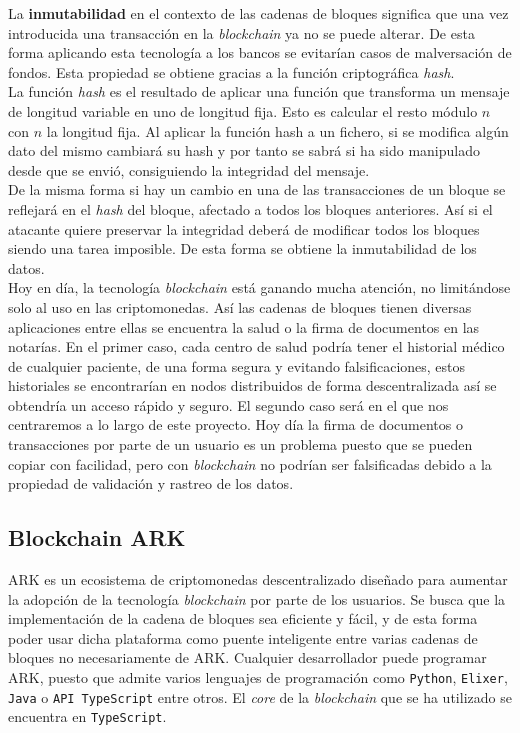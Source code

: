 La \textbf{inmutabilidad} en el contexto de las cadenas de bloques significa que una vez introducida una transacción en la \textit{blockchain} ya no se puede alterar. De esta forma aplicando esta tecnología a los bancos se evitarían casos de malversación de fondos. Esta propiedad se obtiene gracias a la función criptográfica \textit{hash}.\\

La función \textit{hash} es el resultado de aplicar una función que transforma un mensaje de longitud variable en uno de longitud fija. Esto es calcular el resto módulo $n$ con $n$ la longitud fija. Al aplicar la función hash a un fichero, si se modifica algún dato del mismo cambiará su hash y por tanto se sabrá si ha sido manipulado desde que se envió, consiguiendo la integridad del mensaje.\\

De la misma forma si hay un cambio en una de las transacciones de un bloque se reflejará en el \textit{hash} del bloque, afectado a todos los bloques anteriores. Así si el atacante quiere preservar la integridad deberá de modificar todos los bloques siendo una tarea imposible. De esta forma se obtiene la inmutabilidad de los datos.\\

Hoy en día, la tecnología \textit{blockchain} está ganando mucha atención, no limitándose solo al uso en las criptomonedas. Así las cadenas de bloques tienen diversas aplicaciones entre ellas se encuentra la salud o la firma de documentos en las notarías. En el primer caso, cada centro  de salud podría tener el historial médico de cualquier paciente, de una forma segura y evitando falsificaciones, estos historiales se encontrarían en nodos distribuidos de forma descentralizada así se obtendría un acceso rápido y seguro. El segundo caso será en el que nos centraremos a lo largo de este proyecto. Hoy día la firma de documentos o transacciones por parte de un usuario es un problema puesto que se pueden copiar con facilidad, pero con \textit{blockchain} no podrían ser falsificadas debido a la propiedad de validación y rastreo de los datos.\\

\subsection{Blockchain ARK}

ARK es un ecosistema de criptomonedas descentralizado diseñado para aumentar la adopción de la tecnología \textit{blockchain} por parte de los usuarios. Se busca que la implementación de la cadena de bloques sea eficiente y fácil, y de esta forma poder usar dicha plataforma como puente inteligente entre varias cadenas de bloques no necesariamente de ARK. Cualquier desarrollador puede programar ARK, puesto que admite varios lenguajes de programación como \texttt{Python}, \texttt{Elixer}, \texttt{Java} o \texttt{API TypeScript} entre otros. El \textit{core} de la \textit{blockchain} que se ha utilizado se encuentra en \texttt{TypeScript}.\\

